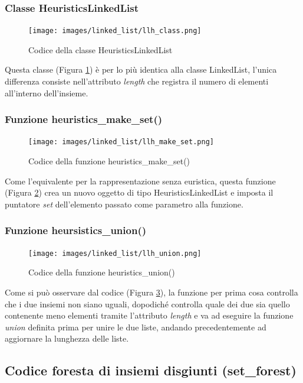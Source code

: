 \documentclass[12pt]{article}
\begin{document}
\subsubsection{Classe HeuristicsLinkedList}
\begin{figure}[h]
    \centering
    \texttt{[image: images/linked\_list/llh\_class.png]}
    \caption{Codice della classe HeuristicsLinkedList}
    \label{fig:llh_class}
\end{figure}
Questa classe (Figura \ref{fig:llh_class}) è per lo più identica alla classe LinkedList, l'unica differenza consiste nell'attributo \textit{length} che registra il numero di elementi all'interno dell'insieme.

\subsubsection{Funzione heuristics\_make\_set()}
\begin{figure}[h]
    \centering
    \texttt{[image: images/linked\_list/llh\_make\_set.png]}
    \caption{Codice della funzione heuristics\_make\_set()}
    \label{fig:llh_make_set}
\end{figure}
Come l'equivalente per la rappresentazione senza euristica, questa funzione (Figura \ref{fig:llh_make_set}) crea un nuovo oggetto di tipo HeuristicsLinkedList e imposta il puntatore \textit{set} dell'elemento passato come parametro alla funzione.

\subsubsection{Funzione heursistics\_union()}
\begin{figure}[h]
    \centering
    \texttt{[image: images/linked\_list/llh\_union.png]}
    \caption{Codice della funzione heuristics\_union()}
    \label{fig:llh_union}
\end{figure}
Come si può osservare dal codice (Figura \ref{fig:llh_union}), la funzione per prima cosa controlla che i due insiemi non siano uguali, dopodiché controlla quale dei due sia quello contenente meno elementi tramite l'attributo \textit{length} e va ad eseguire la funzione \textit{union} definita prima per unire le due liste, andando precedentemente ad aggiornare la lunghezza delle liste.

\subsection{Codice foresta di insiemi disgiunti (set\_forest)}
\end{document}
